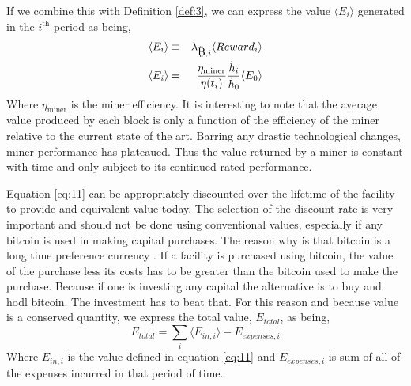 \documentclass[runningheads]{llncs}
\def\bitcoin{
    \leavevmode
    \vtop{\offinterlineskip %
    \setbox0=\hbox{B}
    \setbox2=\hbox to\wd0{\hfil\hskip-.03em
    \vrule height .3ex width .15ex\hskip .08em
    \vrule height .3ex width .15ex\hfil}
    \vbox{\copy2\box0}\box2}
}
\begin{document}
If we combine this with Definition \ref{def:3}, we can express the value $\langle E_i \rangle$ generated in the $i^{\mbox{th}}$ period as being,
\begin{eqnarray}
    \langle E_i \rangle &\equiv& \lambda_{\bitcoin, i} \langle Reward_i \rangle \\
    \langle E_i \rangle &=& \frac{\eta_{\mathrm{miner}}}{\eta(t_i)} \frac{\dot{h}_i}{\dot{h}_0} \langle E_0 \rangle \label{eq:11}
\end{eqnarray}
Where $\eta_{\mathrm{miner}}$ is the miner efficiency.
It is interesting to note that the average value produced by each block is only a function of the efficiency of the miner relative to the current state of the art.
Barring any drastic technological changes, miner performance has plateaued.
Thus the value returned by a miner is constant with time and only subject to its continued rated performance.

Equation \ref{eq:11} can be appropriately discounted over the lifetime of the facility to provide and equivalent value today.
The selection of the discount rate is very important and should not be done using conventional values, especially if any bitcoin is used in making capital purchases.
The reason why is that bitcoin is a long time preference currency \cite{ammous2018bitcoin}.
If a facility is purchased using bitcoin, the value of the purchase less its costs has to be greater than the bitcoin used to make the purchase.
Because if one is investing any capital the alternative is to buy and hodl bitcoin.
The investment has to beat that.
For this reason and because value is a conserved quantity, we express the total value, $E_{total}$, as being,
\begin{equation}
    E_{total} = \sum_i \langle E_{in,i} \rangle - E_{expenses,i}\label{eq:12}
\end{equation}
Where $E_{in,i}$ is the value defined in equation \ref{eq:11} and $E_{expenses,i}$ is sum of all of the expenses incurred in that period of time.

\end{document}
